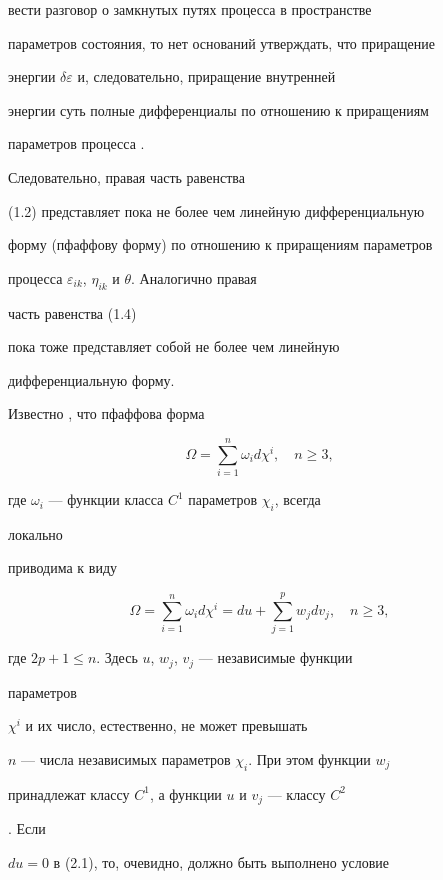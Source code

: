 вести разговор о замкнутых путях процесса в пространстве


параметров состояния, то нет оснований утверждать, что приращение


энергии $\delta\varepsilon$ и, следовательно, приращение внутренней


энергии суть полные дифференциалы по отношению к приращениям


параметров процесса \cite{Ter1}.


Следовательно, правая часть равенства


(1.2) представляет пока не более чем линейную дифференциальную


форму (пфаффову форму) по отношению к приращениям параметров


процесса $\varepsilon_{ik}$, $\eta_{ik}$ и $\theta$. Аналогично правая


часть равенства (1.4)


пока тоже представляет собой не более чем линейную


дифференциальную форму.





Известно \cite{ME}, что пфаффова форма


$$


\Omega=\sum^n_{i=1}\omega_i d\chi^i,\quad n\ge 3,


$$


где $\omega_i$ --- функции класса $C^1$ параметров $\chi_i$, всегда


локально


приводима к виду \cite{ME}


\begin{equation}


\Omega=\sum^n_{i=1}\omega_i d\chi^i=du+\sum^p_{j=1}


w_jdv_j,\quad n\ge 3,\tag{2.1}


\end{equation}


где $2p+1\le n$. Здесь $u$, $w_j$, $v_j$ --- независимые функции


параметров


$\chi^i$ и их число, естественно, не может превышать


$n$ --- числа независимых параметров $\chi_i$. При этом функции $w_j$


принадлежат классу $C^1$, а функции $u$ и $v_j$ --- классу $C^2$


\cite{ME}. Если


$du=0$ в (2.1), то, очевидно, должно быть выполнено условие


